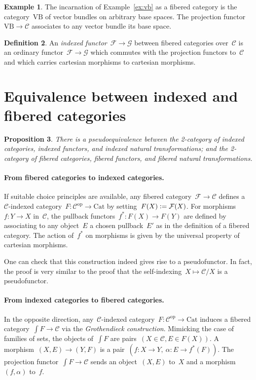 \documentclass[a4paper,english,12pt]{scrartcl}
\theoremstyle{definition}
\newtheorem{defn}{Definition}[section]
\newtheorem{ex}[defn]{Example}
\theoremstyle{plain}
\newtheorem{prop}[defn]{Proposition}
\theoremstyle{remark}
\newcommand{\C}{\mathcal{C}}
\newcommand{\F}{\mathcal{F}}
\newcommand{\G}{\mathcal{G}}
\newcommand{\op}{\mathrm{op}}
\newcommand{\Cat}{\mathrm{Cat}}
\newcommand{\VB}{\mathrm{VB}}
\newcommand{\defeq}{\vcentcolon=}
\begin{document}
\begin{ex}The incarnation of Example~\ref{ex:vb} as a fibered category is the
category~$\VB$ of vector bundles on arbitrary base spaces. The projection
functor~$\VB \to \C$ associates to any vector bundle its base space.\end{ex}

\begin{defn}An \emph{indexed functor}~$\F \to \G$ between fibered categories
over~$\C$ is an ordinary functor~$\F \to \G$ which commutes with the projection
functors to~$\C$ and which carries cartesian morphisms to cartesian
morphisms.\end{defn}


\section{Equivalence between indexed and fibered categories}

\begin{prop}There is a pseudoequivalence between the 2-category of indexed
categories, indexed functors, and indexed natural transformations; and the
2-category of fibered categories, fibered functors, and fibered natural
transformations.\end{prop}

\paragraph{From fibered categories to indexed categories.}
If suitable choice principles are available, any fibered category~$\F \to \C$
defines a~$\C$-indexed category~$F : \C^\op \to \Cat$ by setting~$F(X) \defeq
\F(X)$. For morphisms~$f : Y \to X$ in~$\C$, the pullback functors~$f^* : F(X)
\to F(Y)$ are defined by associating to any object~$E$ a chosen pullback~$E'$
as in the definition of a fibered category. The action of~$f^*$ on morphisms
is given by the universal property of cartesian morphisms.

One can check that this construction indeed gives rise to a pseudofunctor. In
fact, the proof is very similar to the proof that the self-indexing~$X \mapsto
\C/X$ is a pseudofunctor.

\paragraph{From indexed categories to fibered categories.}
In the opposite direction, any~$\C$-indexed category~$F : \C^\op \to \Cat$
induces a fibered category~$\int F \to \C$ via the \emph{Grothendieck
construction}. Mimicking the case of families of sets, the objects of~$\int F$
are pairs~$(X \in \C, E \in F(X))$. A morphism~$(X,E) \to (Y,F)$ is a pair~$(f
: X \to Y,\ \alpha : E \to f^*(F))$. The projection functor~$\int F \to \C$
sends an object~$(X,E)$ to~$X$ and a morphism~$(f,\alpha)$ to~$f$.
\end{document}
